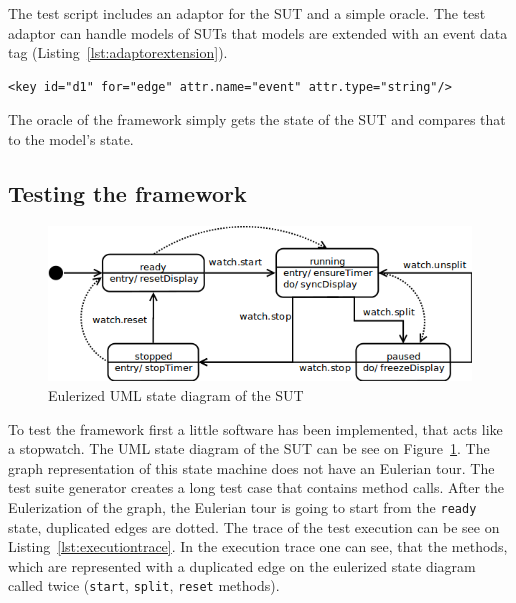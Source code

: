 \documentclass{article}
\begin{document}
The test script includes an adaptor for the SUT and a simple oracle. The test adaptor can handle models of SUTs that models are extended with an event data tag (Listing~\ref{lst:adaptorextension}).

\begin{lstlisting}[label={lst:adaptorextension}, caption=Extension of GraphML for the test adaptor,breaklines=true,basicstyle=\ttfamily\footnotesize,]
<key id="d1" for="edge" attr.name="event" attr.type="string"/>
\end{lstlisting}

The oracle of the framework simply gets the state of the SUT and compares that to the model's state.

\newpage

\subsection{Testing the framework}
\label{sub:testingtheframework}

\begin{figure}[htp]
\centering
\includegraphics[scale=0.5]{img/stopwatch_eulerized.png}
\caption{Eulerized UML state diagram of the SUT}
\label{fig:stopwatch}
\end{figure}

To test the framework first a little software has been implemented, that acts like a stopwatch. The UML state diagram of the SUT can be see on Figure~\ref{fig:stopwatch}. The graph representation of this state machine does not have an Eulerian tour. The test suite generator creates a long test case that contains method calls. After the Eulerization of the graph, the Eulerian tour is going to start from the \texttt{ready} state, duplicated edges are dotted. The trace of the test execution can be see on Listing~\ref{lst:executiontrace}. In the execution trace one can see, that the methods, which are represented with a duplicated edge on the eulerized state diagram called twice (\texttt{start}, \texttt{split}, \texttt{reset} methods).
\end{document}
